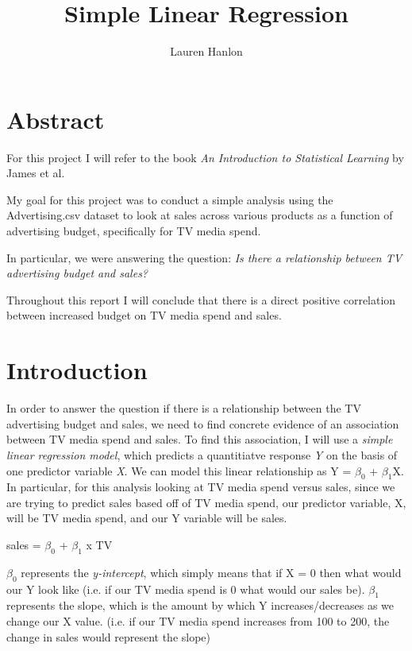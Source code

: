 \documentclass[12pt]{article}
\begin{document}


\title{Simple Linear Regression}

\author{Lauren Hanlon}

\begin{Schunk}
\begin{Sinput}

\end{Sinput}
\end{Schunk}

\section{Abstract}

For this project I will refer to the book \textit{An Introduction to Statistical Learning} by James et al.

My goal for this project was to conduct a simple analysis using the Advertising.csv dataset to look at sales across various products as a function of advertising budget, specifically for TV media spend.

In particular, we were answering the question: \textit{Is there a relationship between TV advertising budget and sales?}

Throughout this report I will conclude that there is a direct positive correlation between increased budget on TV media spend and sales.

\section{Introduction}

In order to answer the question if there is a relationship between the TV advertising budget and sales, we need to find concrete evidence of an association between TV media spend and sales. To find this association, I will use a \textit{simple linear regression model}, which predicts a quantitiatve response \textit{Y} on the basis of one predictor variable \textit{X}. We can model this linear relationship as Y = $\beta_0$ + $\beta_1$X. In particular, for this analysis looking at TV media spend versus sales, since we are trying to predict sales based off of TV media spend, our predictor variable, X, will be TV media spend, and our Y variable will be sales.

sales = $\beta_0$ + $\beta_1$ x TV

$\beta_0$ represents the \textit{y-intercept}, which simply means that if X = 0 then what would our Y look like (i.e. if our TV media spend is 0 what would our sales be).
$\beta_1$ represents the slope, which is the amount by which Y increases/decreases as we change our X value. (i.e. if our TV media spend increases from 100 to 200, the change in sales would represent the slope)
\end{document}
